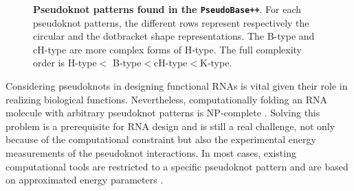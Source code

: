 \begin{figure}[t!]
	\begin{minipage}[b]{.5\linewidth}
		\centering
	\end{minipage}
	\begin{minipage}[b]{.5\linewidth}
		\centering 
	\end{minipage}%
	
\caption{\textbf{Pseudoknot patterns found in the \texttt{PseudoBase++}}. For each pseudoknot patterns, the different rows represent respectively the circular and  the dotbracket shape representations. The B-type and cH-type are more complex forms of H-type. The full complexity order is H-type$<$ B-type$<$cH-type$<$K-type.}\label{fig:pk_type}
\end{figure}
Considering pseudoknots in designing functional RNAs is vital given their role in realizing biological functions. Nevertheless, computationally folding an RNA molecule with arbitrary pseudoknot patterns is \ac{NP}-complete \cite{lyngso_rna_2000}. Solving this problem is a prerequisite for RNA design and is still a real challenge, not only because of the computational constraint but also the experimental energy measurements of the pseudoknot interactions. In most cases, existing computational tools are restricted to a specific pseudoknot pattern and are based on approximated energy parameters \cite{gultyaev_approximation_1999}. 


